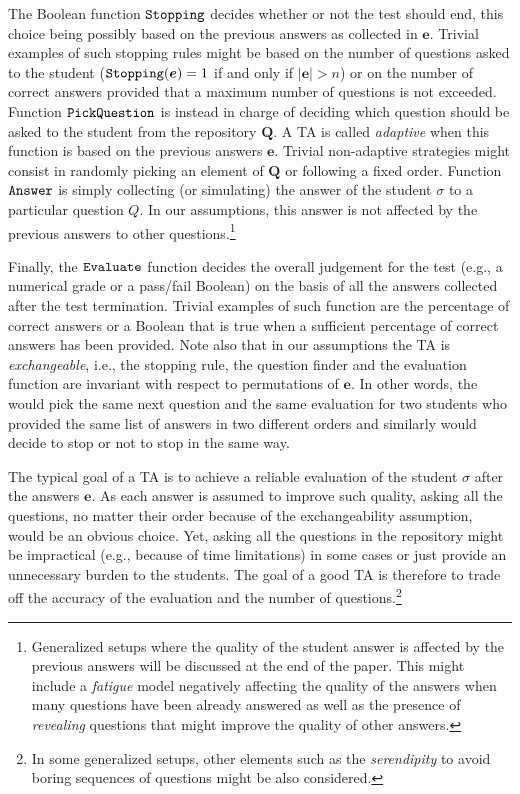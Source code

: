 \documentclass[runningheads]{llncs}
\begin{document}
The Boolean function ${\tt Stopping}$ decides whether or not the test should end, this choice being possibly based on the previous answers as collected in $\bm{e}$. Trivial examples of such stopping rules might be based on the number of questions asked to the student (${\tt Stopping}(\bm{e})=1$ if and only if $|\bm{e}|>n$) or on the number of correct answers provided that a maximum number of questions is not exceeded. Function ${\tt PickQuestion}$ is instead in charge of deciding which question should be asked to the student from the repository $\bm{Q}$. A TA is called \emph{adaptive} when this function is based on the previous answers $\bm{e}$. Trivial non-adaptive strategies might consist in randomly picking an element of $\bm{Q}$ or following a fixed order. Function ${\tt Answer}$ is simply collecting (or simulating) the answer of the student $\sigma$ to a particular question $Q$. In our assumptions, this answer is not affected by the previous answers to other questions.\footnote{Generalized setups where the quality of the student answer is affected by the previous answers will be discussed at the end of the paper. This might include a \emph{fatigue} model negatively affecting the quality of the answers when many questions have been already answered as well as the presence of \emph{revealing} questions that might improve the quality of other answers.} 

Finally, the ${\tt Evaluate}$ function decides the overall judgement for the test (e.g., a numerical grade or a pass/fail Boolean) on the basis of all the answers collected after the test termination. Trivial examples of such function are the percentage of correct answers or a Boolean that is true when a sufficient percentage of correct answers has been provided. Note also that in our assumptions the TA is \emph{exchangeable}, i.e., the stopping rule, the question finder and the evaluation function are invariant with respect to permutations of $\bm{e}$. In other words, the would pick the same next question and the same evaluation for two students who provided the same list of answers in two different orders and similarly would decide to stop or not to stop in the same way. 

The typical goal of a TA is to achieve a reliable evaluation of the student $\sigma$ after the answers $\bm{e}$. As each answer is assumed to improve such quality, asking all the questions, no matter their order because of the exchangeability assumption, would be an obvious choice. Yet, asking all the questions in the repository might be impractical (e.g., because of time limitations) in some cases or just provide an unnecessary burden to the students. The goal of a good TA is therefore to trade off the accuracy of the evaluation and the number of questions.\footnote{In some generalized setups, other elements such as the \emph{serendipity} to avoid boring sequences of questions might be also considered.}
\end{document}
